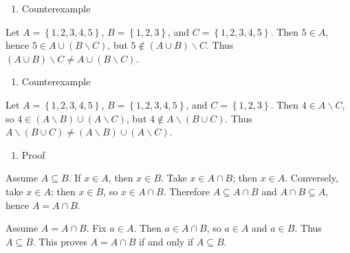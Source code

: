 \begin{qlsolution}{\begin{enumerate}
\def\labelenumi{(\alph{enumi})}
\setcounter{enumi}{1}
\tightlist
\item
  Counterexample
\end{enumerate}}

Let \(A = \left\{ {1,2,3,4,5} \right\}\), \(B = \left\{ {1,2,3} \right\}\), and \(C = \left\{ {1,2,3,4,5} \right\}\). Then \(5 \in A\), hence \(5 \in A \cup \left( {B \smallsetminus C} \right)\), but \(5 \notin \left( {A \cup B} \right) \smallsetminus C\). Thus \(\left( {A \cup B} \right) \smallsetminus C \neq A \cup \left( {B \smallsetminus C} \right)\).

\end{qlsolution}

\begin{qlsolution}{\begin{enumerate}
\def\labelenumi{(\alph{enumi})}
\setcounter{enumi}{2}
\tightlist
\item
  Counterexample
\end{enumerate}}

Let \(A = \left\{ {1,2,3,4,5} \right\}\), \(B = \left\{ {1,2,3,4,5} \right\}\), and \(C = \left\{ {1,2,3} \right\}\). Then \(4 \in A \smallsetminus C\), so \(4 \in \left( {A \smallsetminus B} \right) \cup \left( {A \smallsetminus C} \right)\), but \(4 \notin A \smallsetminus \left( {B \cup C} \right)\). Thus \(A \smallsetminus \left( {B \cup C} \right) \neq \left( {A \smallsetminus B} \right) \cup \left( {A \smallsetminus C} \right)\).

\end{qlsolution}

\begin{qlsolution}{\begin{enumerate}
\def\labelenumi{(\alph{enumi})}
\setcounter{enumi}{3}
\tightlist
\item
  Proof
\end{enumerate}}

Assume \(A \subseteq B\). If \(x \in A\), then \(x \in B\). Take \(x \in A \cap B\); then \(x \in A\). Conversely, take \(x \in A\); then \(x \in B\), so \(x \in A \cap B\). Therefore \(A \subseteq A \cap B\) and \(A \cap B \subseteq A\), hence \(A = A \cap B\).

Assume \(A = A \cap B\). Fix \(a \in A\). Then \(a \in A \cap B\), so \(a \in A\) and \(a \in B\). Thus \(A \subseteq B\). This proves \(A = A \cap B\) if and only if \(A \subseteq B\).

\end{qlsolution}

